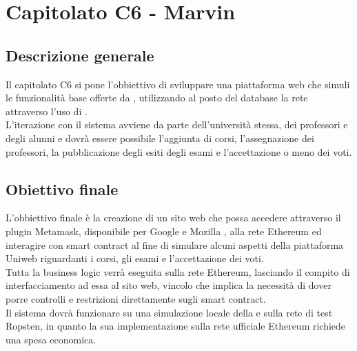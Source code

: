 \documentclass[StudioDiFattibilità.tex]{subfiles}
\begin{document}
\chapter{Capitolato C6 - Marvin}
\section{Descrizione generale}
Il capitolato C6 si pone l'obbiettivo di sviluppare una piattaforma web che simuli le funzionalità base offerte da , utilizzando al posto del database la rete  attraverso l'uso di .\\
L'iterazione con il sistema avviene da parte dell'università stessa, dei professori e degli alunni e dovrà essere possibile l'aggiunta di corsi, l'assegnazione dei professori, la pubblicazione degli esiti degli esami e l'accettazione o meno dei voti.
\section{Obiettivo finale}
L'obbiettivo finale è la creazione di un sito web che possa accedere attraverso il plugin Metamask, disponibile per Google  e Mozilla , alla rete Ethereum ed interagire con smart contract al fine di simulare alcuni aspetti della piattaforma Uniweb riguardanti i corsi, gli esami e l'accettazione dei voti.\\
Tutta la business logic verrà eseguita sulla rete Ethereum, lasciando il compito di interfacciamento ad essa al sito web, vincolo che implica la necessità di dover porre controlli e restrizioni direttamente sugli smart contract.\\
Il sistema dovrà funzionare su una simulazione locale della  e sulla rete di test Ropsten, in quanto la sua implementazione sulla rete ufficiale Ethereum richiede una spesa economica.
\end{document}
